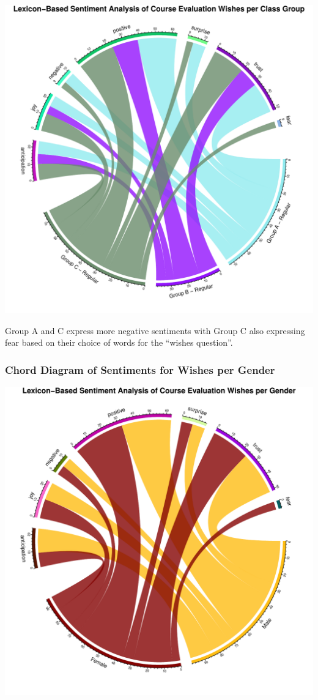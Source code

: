 \documentclass[
]{article}
\begin{document}
\includegraphics{Mid-SemesterCourseEvaluation-20240819-20241125-ADB-BBIT2.2_files/figure-latex/ChordDiagramPerGroup_Wishes-1.pdf}

Group A and C express more negative sentiments with Group C also
expressing fear based on their choice of words for the ``wishes
question''.

\newpage

\subsubsection{Chord Diagram of Sentiments for Wishes per
Gender}\label{chord-diagram-of-sentiments-for-wishes-per-gender}

\includegraphics{Mid-SemesterCourseEvaluation-20240819-20241125-ADB-BBIT2.2_files/figure-latex/ChordDiagramPerGender_Wishes-1.pdf}
\end{document}
